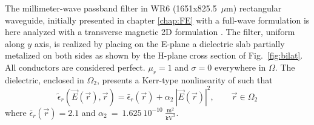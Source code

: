 The millimeter-wave passband filter in WR6 (1651x825.5~$\mu$m) rectangular 
waveguide, initially presented in chapter \ref{chap:FE} with a full-wave formulation is here analyzed with a transverse magnetic 2D formulation \cite{bui1984broad}. 
The filter, uniform along $y$ axis, is realized by placing on the E-plane a 
dielectric slab partially metalized on both sides as shown by the H-plane cross
section of Fig.~\ref{fig:bilat}. All conductors are considered perfect. $\mu_r = 1$ and $\sigma = 0$ everywhere in $\Omega$.
The dielectric, enclosed in $\Omega_2$, presents a Kerr-type nonlinearity of
such that \cite{Guarnieri2010}
\begin{equation}
\tilde{\epsilon}_r(\vec{E}(\vec{r}), \vec{r}) = \bar{\epsilon}_r(\vec{r}) + 
\alpha_2 \ |\vec{E}(\vec{r})|^2, \qquad \vec{r} \in \Omega_2
\end{equation}
\noindent where $\bar{\epsilon}_r(\vec{r}) = 2.1$ and 
$\alpha_2~=~1.625~10^{-10}~{\frac{\mathrm{m}^2}{\mathrm{kV}^2}}$.

